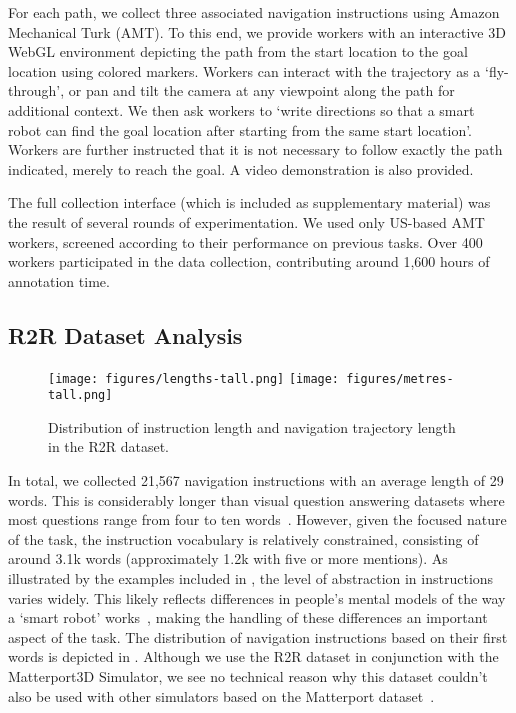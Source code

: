 \documentclass[10pt,twocolumn,letterpaper]{article}
\begin{document}
For each path, we collect three associated navigation instructions using Amazon Mechanical Turk (AMT). To this end, we provide workers with an interactive 3D WebGL environment depicting the path from the start location to the goal location using colored markers. Workers can interact with the trajectory as a `fly-through', or pan and tilt the camera at any viewpoint along the path for additional context. We then ask workers to `write directions so that a smart robot can find the goal location after starting from the same start location'. Workers are further instructed that it is not necessary to follow exactly the path indicated, merely to reach the goal. A video demonstration is also provided. 

The full collection interface (which is included as supplementary material) was the result of several rounds of experimentation. We used only US-based AMT workers, screened according to their performance on previous tasks. Over 400 workers participated in the data collection, contributing around 1,600 hours of annotation time.

\subsection{R2R Dataset Analysis}
\label{sec:analysis}


\begin{figure}[t]
	\begin{center}
		\texttt{[image: figures/lengths-tall.png]}
		\texttt{[image: figures/metres-tall.png]}
	\end{center}
	\caption{Distribution of instruction length and navigation trajectory length in the R2R dataset.}
	\label{fig:lengths}
\end{figure}

In total, we collected 21,567 navigation instructions with an average length of 29 words. This is considerably longer than visual question answering datasets where most questions range from four to ten words~\cite{VQA}. However, given the focused nature of the task, the instruction vocabulary is relatively constrained, consisting of around 3.1k words (approximately 1.2k with five or more mentions). As illustrated by the examples included in , the level of abstraction in instructions varies widely. This likely reflects differences in people's mental models of the way a `smart robot' works~\cite{Norman:2002}, making the handling of these differences an important aspect of the task. The distribution of navigation instructions based on their first words is depicted in . Although we use the R2R dataset in conjunction with the Matterport3D Simulator, we see no technical reason why this dataset couldn't also be used with other simulators based on the Matterport dataset~\cite{Matterport3D}.
\end{document}
